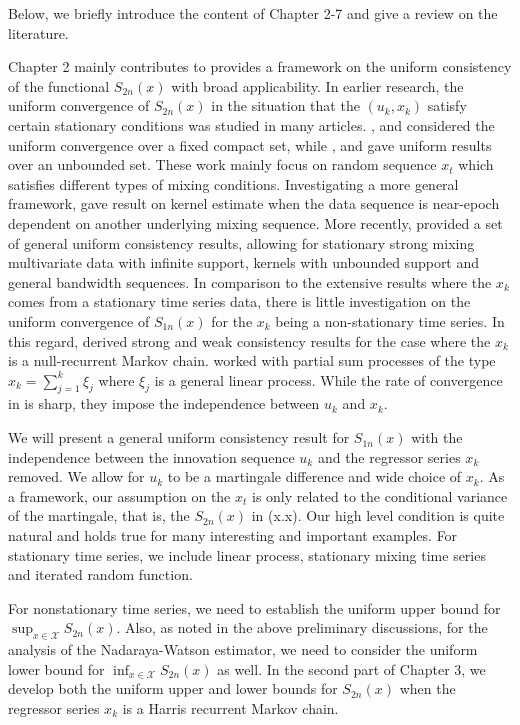 Below, we briefly introduce the content of Chapter 2-7 and give a review on the literature. 

Chapter 2 mainly contributes to provides a framework on the uniform consistency of the functional $S_{2n}(x)$ with broad applicability. In earlier research, the uniform convergence of $S_{2n}(x)$ in the situation that the $(u_k, x_k)$ satisfy certain stationary conditions was studied in many articles. \cite{liero}, \cite{peligrad} and \cite{angonze} considered the uniform convergence over a fixed compact set, while \cite{masry}, \cite{bosq} and \cite{fan} gave uniform results over an unbounded set. These work mainly focus on random sequence $x_t$ which satisfies different types of mixing conditions. Investigating a more general framework, \cite{andrew} gave result on kernel estimate when the data sequence is near-epoch dependent on another underlying mixing sequence. More recently, \cite{hansen} provided a set of general uniform consistency results, allowing for stationary strong mixing multivariate data with infinite support, kernels with unbounded support and general bandwidth sequences. In comparison to the extensive results where the  $x_k$ comes from a stationary time series data, there is little investigation on the uniform convergence of $S_{1n}(x)$ for the $x_k$ being a non-stationary time series. In this regard, \cite{gao3} derived strong and weak consistency results for the case where the $x_k$ is a null-recurrent Markov chain. \cite{wangwang} worked  with partial sum processes of the type $x_k=\sum_{j=1}^k\xi_j$ where $\xi_j$ is a general linear process. While the rate of convergence   in \cite{gao3} is sharp,  they impose the independence between $u_k$ and $x_k$.

We will present a general uniform consistency  result for $S_{1n}(x)$ with the independence between the innovation sequence $u_k$ and the regressor series $x_k$ removed. We allow for $u_k$ to be a martingale difference and wide choice of $x_k$. As a framework,  our  assumption on the $x_t$ is only related to the conditional variance of the  martingale, that is, the $S_{2n}(x)$ in (x.x). Our high level condition is quite natural and holds true for many interesting and important examples. For stationary time series, we include linear process, stationary mixing time series and iterated random function.

For nonstationary time series, we need to establish the uniform upper bound for $\sup_{x \in \mathcal{X}} S_{2n}(x)$. Also, as noted in the above preliminary discussions, for the analysis of the Nadaraya-Watson estimator, we need to consider the uniform lower bound for $\inf_{x \in \mathcal{X}} S_{2n}(x)$ as well. In the second part of Chapter 3, we develop both the uniform upper and lower bounds for $S_{2n}(x)$ when the regressor series $x_k$ is a  Harris recurrent Markov chain.


